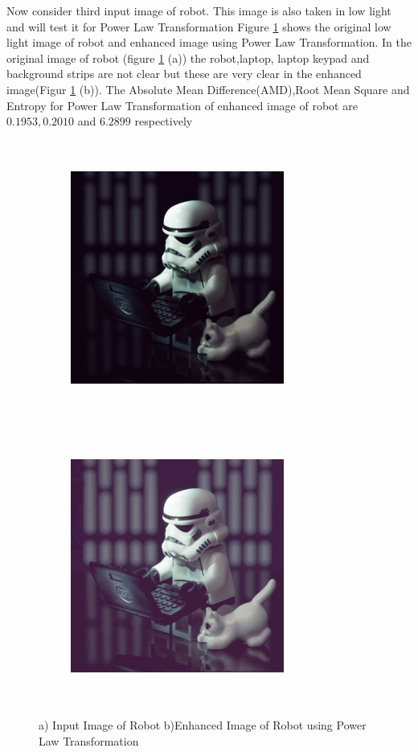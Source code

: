 Now consider third input image of robot. This image is also taken in low light and will test it for Power Law Transformation Figure \ref{fig:robotPowerLaw} shows the original low light image of robot and enhanced image using  Power Law Transformation. In the original image of robot (figure \ref{fig:robotPowerLaw} (a))  the robot,laptop, laptop keypad and background strips are not clear but these are very clear in the enhanced image(Figur \ref{fig:robotPowerLaw} (b)). The Absolute Mean Difference(AMD),Root Mean Square and Entropy for  Power Law Transformation of enhanced image of robot are $0.1953, 0.2010$ and $6.2899$ respectively      


\begin{figure}
	\begin{subfigure}{8cm}
		\centering    
    	\includegraphics[width=7cm,height=9cm,keepaspectratio]{images/ch5/robot_input.jpg}
    	\caption{} 
    \end{subfigure}
  	\begin{subfigure}{6cm}
  		\centering
  		\includegraphics[width=7cm,height=9cm,keepaspectratio]{images/ch5/robot_power.jpg}
   		\caption{}
  	\end{subfigure}
  	\caption{a) Input Image of Robot b)Enhanced Image of Robot using Power Law Transformation}
  	\label{fig:robotPowerLaw}
\end{figure}


